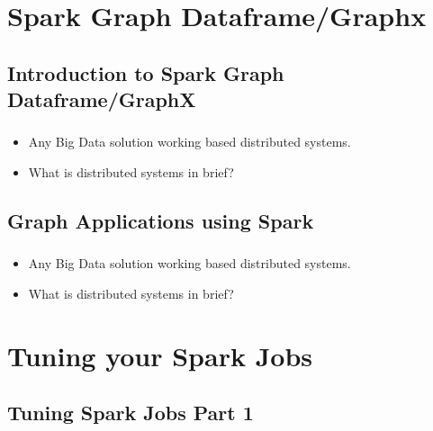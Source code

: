 
\section{Spark Graph Dataframe/Graphx}
\subsection{Introduction to Spark Graph Dataframe/GraphX}

\begin{frame}
  \frametitle{\subsecname}
	\begin{itemize}[<+->]
		\item Any Big Data solution working based distributed systems.
		\item What is distributed systems in brief?
	\end{itemize}
\end{frame}

\subsection{Graph Applications using Spark}

\begin{frame}
  \frametitle{\subsecname}
	\begin{itemize}[<+->]
		\item Any Big Data solution working based distributed systems.
		\item What is distributed systems in brief?
	\end{itemize}
\end{frame}



\section{Tuning your Spark Jobs}

\subsection{Tuning Spark Jobs Part 1}

